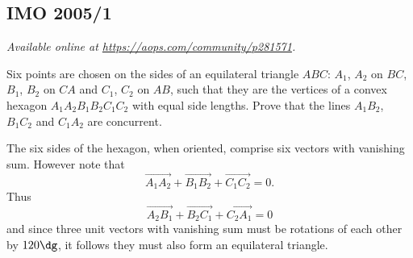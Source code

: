 \documentclass[11pt]{scrartcl}
\begin{document}
\subsection{IMO 2005/1}
\textsl{Available online at \url{https://aops.com/community/p281571}.}
\begin{mdframed}[style=mdpurplebox,frametitle={Problem statement}]
Six points are chosen on the sides of an equilateral triangle $ABC$:
$A_1$, $A_2$ on $BC$, $B_1$, $B_2$ on $CA$ and $C_1$, $C_2$ on $AB$,
such that they are the vertices of a
convex hexagon $A_1A_2B_1B_2C_1C_2$ with equal side lengths.
Prove that the lines $A_1B_2$, $B_1C_2$ and $C_1A_2$ are concurrent.
\end{mdframed}
The six sides of the hexagon, when oriented, comprise
six vectors with vanishing sum.
However note that \[ \overrightarrow{A_1A_2}
+ \overrightarrow{B_1B_2}
+ \overrightarrow{C_1C_2} = 0. \]
Thus
\[ \overrightarrow{A_2B_1} + \overrightarrow{B_2C_1} +
\overrightarrow{C_2A_1} = 0 \]
and since three unit vectors with vanishing sum
must be rotations of each other by $120\dg$,
it follows they must also form an equilateral triangle.
\end{document}
